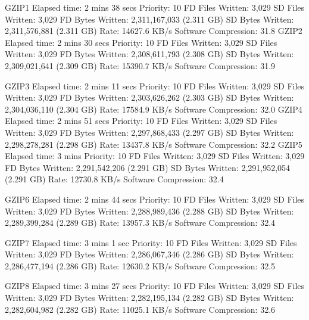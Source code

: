 GZIP1
  Elapsed time:           2 mins 38 secs
  Priority:               10
  FD Files Written:       3,029
  SD Files Written:       3,029
  FD Bytes Written:       2,311,167,033 (2.311 GB)
  SD Bytes Written:       2,311,576,881 (2.311 GB)
  Rate:                   14627.6 KB/s
  Software Compression:   31.8%
GZIP2
  Elapsed time:           2 mins 30 secs
  Priority:               10
  FD Files Written:       3,029
  SD Files Written:       3,029
  FD Bytes Written:       2,308,611,793 (2.308 GB)
  SD Bytes Written:       2,309,021,641 (2.309 GB)
  Rate:                   15390.7 KB/s
  Software Compression:   31.9%

GZIP3
  Elapsed time:           2 mins 11 secs
  Priority:               10
  FD Files Written:       3,029
  SD Files Written:       3,029
  FD Bytes Written:       2,303,626,262 (2.303 GB)
  SD Bytes Written:       2,304,036,110 (2.304 GB)
  Rate:                   17584.9 KB/s
  Software Compression:   32.0%
GZIP4
  Elapsed time:           2 mins 51 secs
  Priority:               10
  FD Files Written:       3,029
  SD Files Written:       3,029
  FD Bytes Written:       2,297,868,433 (2.297 GB)
  SD Bytes Written:       2,298,278,281 (2.298 GB)
  Rate:                   13437.8 KB/s
  Software Compression:   32.2%
GZIP5
  Elapsed time:           3 mins 
  Priority:               10
  FD Files Written:       3,029
  SD Files Written:       3,029
  FD Bytes Written:       2,291,542,206 (2.291 GB)
  SD Bytes Written:       2,291,952,054 (2.291 GB)
  Rate:                   12730.8 KB/s
  Software Compression:   32.4%

GZIP6
  Elapsed time:           2 mins 44 secs
  Priority:               10
  FD Files Written:       3,029
  SD Files Written:       3,029
  FD Bytes Written:       2,288,989,436 (2.288 GB)
  SD Bytes Written:       2,289,399,284 (2.289 GB)
  Rate:                   13957.3 KB/s
  Software Compression:   32.4%

GZIP7
  Elapsed time:           3 mins 1 sec
  Priority:               10
  FD Files Written:       3,029
  SD Files Written:       3,029
  FD Bytes Written:       2,286,067,346 (2.286 GB)
  SD Bytes Written:       2,286,477,194 (2.286 GB)
  Rate:                   12630.2 KB/s
  Software Compression:   32.5%

GZIP8
  Elapsed time:           3 mins 27 secs
  Priority:               10
  FD Files Written:       3,029
  SD Files Written:       3,029
  FD Bytes Written:       2,282,195,134 (2.282 GB)
  SD Bytes Written:       2,282,604,982 (2.282 GB)
  Rate:                   11025.1 KB/s
  Software Compression:   32.6%

